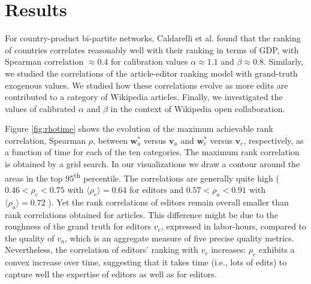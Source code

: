 \section{Results}
For country-product bi-partite networks,  Caldarelli et al. \cite{caldarelli2012network} found that the ranking of countries correlates reasonably well with their ranking in terms of GDP, with Spearman correlation $\approx 0.4$ for calibration values $\alpha \approx 1.1$ and $\beta \approx 0.8$. Similarly, we studied the correlations of the article-editor ranking model with grand-truth exogenous values. We studied how these correlations evolve as more edits are contributed to a category of Wikipedia articles. Finally, we investigated the values of calibrated $\alpha$ and $\beta$ in the context of Wikipedia open collaboration.

Figure \ref{fig:rhotime} shows the evolution of the maximum achievable rank correlation, Spearman $\rho$, between $\mathbf{w}^*_a$ versus $\mathbf{v}_a$ and $\mathbf{w}^*_e$ versus $\mathbf{v}_e$, respectively, as a function of time for each of the ten categories.  The maximum rank correlation is obtained by a grid search. In our visualizations we draw a contour around the areas in the top 95\textsuperscript{th} percentile.
The correlations are generally quite high ( $ 0.46 < \rho_e < 0.75$ with $\langle \rho_e\rangle = 0.64$ for editors and $0.57 < \rho_a < 0.91$ with $\langle \rho_a\rangle = 0.72$ ). Yet the rank correlations of editors remain overall smaller than rank correlations obtained for articles. This difference might be due to the roughness of the grand truth for editors $v_e$, expressed in labor-hours, compared to the quality of $v_a$, which is an aggregate measure of five precise quality metrics. Nevertheless, the correlation of editors' ranking with $v_e$ increases: $\rho_e$ exhibits a convex increase over time, suggesting that it takes time (i.e., lots of edits) to capture well the expertise of editors as well as for editors. 


